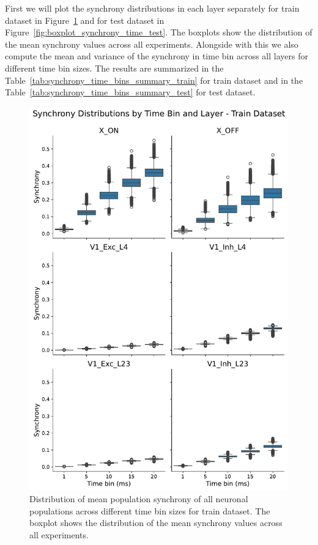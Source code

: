 First we will plot the synchrony distributions in each layer separately for train dataset in Figure~\ref{fig:boxplot_synchrony_time_train} and for test dataset in Figure~\ref{fig:boxplot_synchrony_time_test}. The boxplots show the distribution of the mean synchrony values across all experiments. Alongside with this we also compute the mean and variance of the synchrony in time bin across all layers for different time bin sizes. The results are summarized in the Table~\ref{tab:synchrony_time_bins_summary_train} for train dataset and in the Table~\ref{tab:synchrony_time_bins_summary_test} for test dataset.


\begin{figure}
    \centering
    \includegraphics[width=0.92\linewidth]{img/plots/synchrony_boxplot_time_bins_train.pdf}
    \caption{Distribution of mean population synchrony of all neuronal populations across different time bin sizes for train dataset. The boxplot shows the distribution of the mean synchrony values across all experiments.}
    \label{fig:boxplot_synchrony_time_train}
\end{figure}


